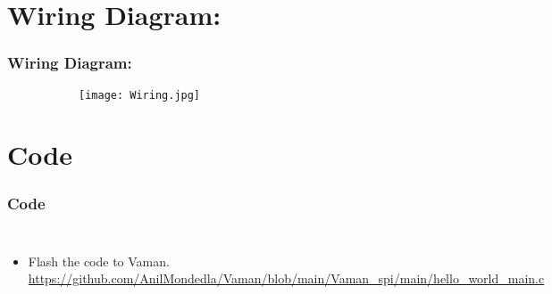 \documentclass{beamer}
\begin{document}
\section{Wiring Diagram:}
\begin{frame}
\frametitle{Wiring Diagram:}

\begin{figure}[h!]
  \centering
  \begin{subfigure}[b]{0.75\linewidth}
    \texttt{[image: Wiring.jpg]}
  \end{subfigure}


\end{figure}

\end{frame}



\section{Code}
\begin{frame}
\frametitle{Code}
\begin{columns}

  \begin{itemize}
  \item  Flash the code to Vaman.\\
  \url{https://github.com/AnilMondedla/Vaman/blob/main/Vaman_spi/main/hello_world_main.c}
  
  
  \end{itemize}
  \  
\end{columns}



\end{frame}
\end{document}
